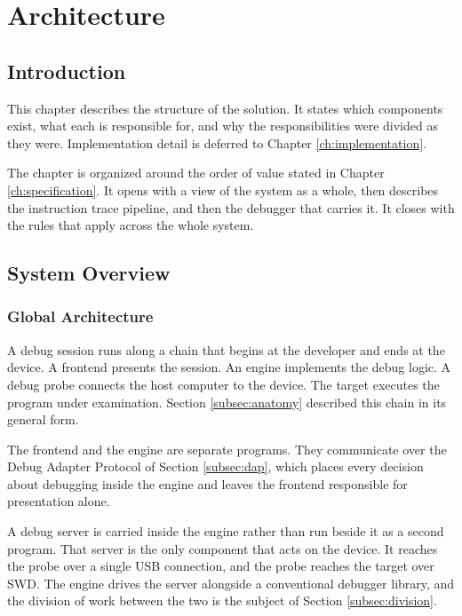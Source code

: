 \chapter{Architecture}

\section*{Introduction}
This chapter describes the structure of the solution. It states which components exist, what each is responsible for, and why the responsibilities were divided as they were. Implementation detail is deferred to Chapter \ref{ch:implementation}.

The chapter is organized around the order of value stated in Chapter \ref{ch:specification}. It opens with a view of the system as a whole, then describes the instruction trace pipeline, and then the debugger that carries it. It closes with the rules that apply across the whole system.

\section{System Overview}
\label{sec:overview}

\subsection{Global Architecture}
A debug session runs along a chain that begins at the developer and ends at the device. A frontend presents the session. An engine implements the debug logic. A debug probe connects the host computer to the device. The target executes the program under examination. Section \ref{subsec:anatomy} described this chain in its general form.

The frontend and the engine are separate programs. They communicate over the Debug Adapter Protocol of Section \ref{subsec:dap}, which places every decision about debugging inside the engine and leaves the frontend responsible for presentation alone.

A debug server is carried inside the engine rather than run beside it as a second program. That server is the only component that acts on the device. It reaches the probe over a single USB connection, and the probe reaches the target over SWD. The engine drives the server alongside a conventional debugger library, and the division of work between the two is the subject of Section \ref{subsec:division}.

